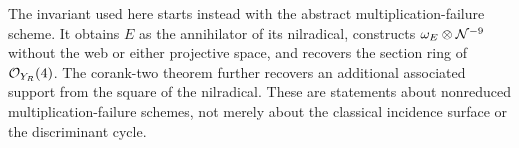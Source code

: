The invariant used here starts instead with the abstract
multiplication-failure scheme. It obtains $E$ as the annihilator of
its nilradical, constructs
$\omega_E\otimes\mathcal N^{-9}$ without the web or either projective
space, and recovers the section ring of $\mathcal O_{Y_R}(4)$.
The corank-two theorem further recovers an additional associated
support from the square of the nilradical. These are statements about
nonreduced multiplication-failure schemes, not merely about the
classical incidence surface or the discriminant cycle.
